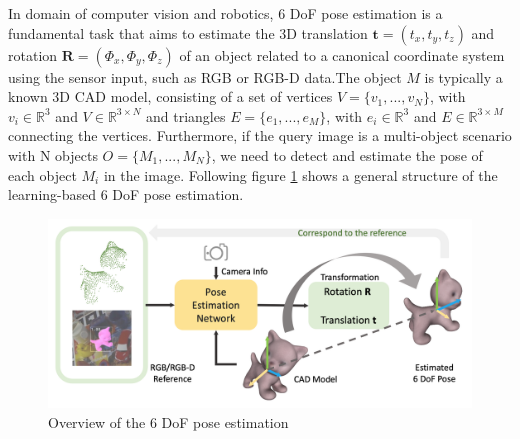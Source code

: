 \documentclass[12pt,DIV14,BCOR12mm,a4paper,footinclude=false,headinclude,parskip=half-,twoside,openright,cleardoublepage=empty,toc=index,bibliography=totoc,listof=totoc]{scrreprt}
\numberwithin{equation}{chapter}
\begin{document}
In domain of computer vision and robotics, 6 DoF pose estimation is a fundamental task that aims to estimate the 3D translation $\mathbf{t}=(t_{x} ,t_{y} ,t_{z} )$ and rotation $\mathbf{R}=(\Phi_{x} ,\Phi_{y} ,\Phi_{z} )$ of an object related to a canonical coordinate system using the sensor input, such as RGB or RGB-D data\cite{peng_pvnet_2019}.The object $M$ is typically a known 3D CAD model, consisting of a set of vertices $V=\{v_1,...,v_N\}$, with $v_i\in \mathbb{R}^3$ and $V\in \mathbb{R}^{3 \times N}$ and triangles $E=\{e_1,...,e_M\}$, with $e_i\in \mathbb{R}^3$ and $E\in \mathbb{R}^{3\times M}$ connecting the vertices. Furthermore, if the query image is a multi-object scenario with N objects $O=\{M_1,...,M_N\}$, we need to detect and estimate the pose of each object $M_i$ in the image\cite{Fabian_2021}.
Following figure \ref{img:6d} shows a general structure of the learning-based 6 DoF pose estimation.

\begin{figure}[h]
	\centering
	\includegraphics[scale=.2]{img/6d.png}
	\caption{Overview of the 6 DoF pose estimation}
	\label{img:6d}
\end{figure}
\end{document}

